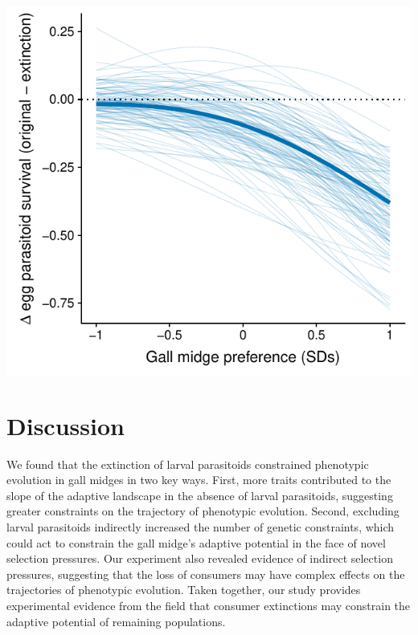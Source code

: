 \documentclass[11pt,]{article}
\let\origfigure\figure
\let\endorigfigure\endfigure
\renewenvironment{figure}[1][2] {
    \expandafter\origfigure\expandafter[H]
} {
    \endorigfigure
}
\begin{document}
\begin{figure}
\centering
\includegraphics{../analyses/selection_on_Platygaster.pdf}
\caption{\label{fig:EggPtoid_Selection}Selection imposed by larval
parasitoids on egg parasitoids (\emph{Platygaster} sp.). The bold line
represents the average difference in the probability of observing the
egg parasitoid (original - extinction of larval parastioids) as a
function of gall midge oviposition preference. Thin lines represent
bootstrapped replicates to show the uncertainty in selection. For
clarity, we only display 100 bootstraps even though inferences are based
on 1,000 replicates. The decrease in the probability of observing egg
parasitoids at high gall-midge densities indicate that larval
parasitoids impose nonlinear selection on egg parasitoids.}
\end{figure}

\section{Discussion}\label{discussion}

We found that the extinction of larval parasitoids constrained
phenotypic evolution in gall midges in two key ways. First, more traits
contributed to the slope of the adaptive landscape in the absence of
larval parasitoids, suggesting greater constraints on the trajectory of
phenotypic evolution. Second, excluding larval parasitoids indirectly
increased the number of genetic constraints, which could act to
constrain the gall midge's adaptive potential in the face of novel
selection pressures. Our experiment also revealed evidence of indirect
selection pressures, suggesting that the loss of consumers may have
complex effects on the trajectories of phenotypic evolution. Taken
together, our study provides experimental evidence from the field that
consumer extinctions may constrain the adaptive potential of remaining
populations.
\end{document}
